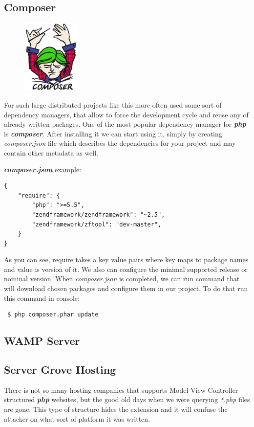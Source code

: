\subsection{Composer}
\begin{figure}
	\includegraphics[width=3cm]{img/zf2/composer-logo.png}
\end{figure} 
For such large distributed projects like this more often used some sort of dependency managers, that allow to force the development cycle and reuse any of already written packages. One of the most popular dependency manager for \textbf{\textit{php}} is \textbf{\textit{composer}}.
After installing it we can start using it, simply by creating \textit{composer.json} file which describes the dependencies for your project and may contain other metadata as well.~\cite{Composer_doc} 

\textbf{\textit{composer.json}} example:

\begin{verbatim}
{
    "require": {
        "php": ">=5.5",
        "zendframework/zendframework": "~2.5",
        "zendframework/zftool": "dev-master",
    }
}
\end{verbatim}

As you can see, require takes a key value pairs where key maps to package names and value is version of it. We also can configure the minimal supported release or nominal version. When \textit{composer.json} is completed, we can run command that will download chosen packages and configure them in our project. To do that run this command in console:
\begin{verbatim}
 $ php composer.phar update
\end{verbatim} 

\subsection{WAMP Server}

\subsection{Server Grove Hosting}
There is not so many hosting companies that supports Model View Controller structured \textbf{\textit{php}} websites, but the good old days when we were querying \textit{*.php} files are gone. This type of structure hides the extension and it will confuse the attacker on what sort of platform it was written.

